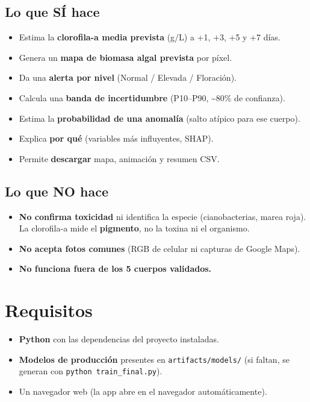 \documentclass[11pt]{article}
\begin{document}
\subsection*{Lo que S\'I hace}
\begin{itemize}
  \item Estima la \textbf{clorofila-a media prevista} (\textmu g/L) a +1, +3, +5 y +7 d\'ias.
  \item Genera un \textbf{mapa de biomasa algal prevista} por p\'ixel.
  \item Da una \textbf{alerta por nivel} (Normal / Elevada / Floraci\'on).
  \item Calcula una \textbf{banda de incertidumbre} (P10--P90, \textasciitilde80\% de confianza).
  \item Estima la \textbf{probabilidad de una anomal\'ia} (salto at\'ipico para ese cuerpo).
  \item Explica \textbf{por qu\'e} (variables m\'as influyentes, SHAP).
  \item Permite \textbf{descargar} mapa, animaci\'on y resumen CSV.
\end{itemize}

\subsection*{Lo que NO hace}
\begin{itemize}
  \item \textbf{No confirma toxicidad} ni identifica la especie (cianobacterias, marea
  roja). La clorofila-a mide el \textbf{pigmento}, no la toxina ni el organismo.
  \item \textbf{No acepta fotos comunes} (RGB de celular ni capturas de Google Maps).
  \item \textbf{No funciona fuera de los 5 cuerpos validados.}
\end{itemize}

\section{Requisitos}
\begin{itemize}
  \item \textbf{Python} con las dependencias del proyecto instaladas.
  \item \textbf{Modelos de producci\'on} presentes en \texttt{artifacts/models/}
  (si faltan, se generan con \texttt{python train\_final.py}).
  \item Un navegador web (la app abre en el navegador autom\'aticamente).
\end{itemize}
\end{document}
